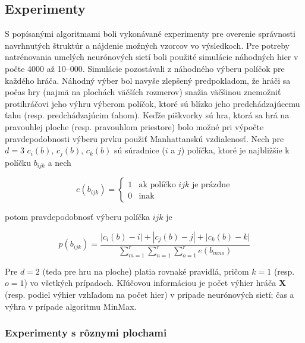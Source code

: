 \subsection{Experimenty}\label{subsec:experiments}
S popísanými algoritmami boli vykonávané experimenty pre overenie správnosti navrhnutých štruktúr a nájdenie možných
vzorcov vo výsledkoch.
Pre potreby natrénovania umelých neurónových sietí boli použité simulácie náhodných hier v počte 4000 až 10--000.
Simulácie pozostávali z náhodného výberu políčok pre každého hráča.
Náhodný výber bol navyše zlepšený predpokladom, že hráči sa počas hry (najmä na plochách väčších rozmerov) snažia
väčšinou znemožniť protihráčovi jeho výhru výberom políčok, ktoré sú blízko jeho predchádzajúcemu ťahu
(resp. predchádzajúcim ťahom).
Keďže piškvorky sú hra, ktorá sa hrá na pravouhlej ploche (resp. pravouhlom priestore) bolo možné pri výpočte
pravdepodobnosti výberu prvku použiť Manhattanskú vzdialenosť.
Nech pre $d=3$ $c_i(b)$, $c_j(b)$, $c_k(b)$ sú súradnice ($i$ a $j$) políčka, ktoré je najbližšie k políčku $b_{ijk}$ a
nech

\begin{equation}
    e(b_{ijk}) =
    \begin{cases}
        1 & \text{ak políčko }ijk\text{ je prázdne} \\
        0 & \text{inak}
    \end{cases}
\end{equation}

potom pravdepodobnosť výberu políčka $ijk$ je

\begin{equation}
    p(b_{ijk}) = \frac{|c_i(b) - i| + |c_j(b) - j| + |c_k(b) - k|}{\sum_{m=1}^r\sum_{n=1}^r\sum_{o=1}^r e(b_{mno})}
\end{equation}

Pre $d=2$ (teda pre hru na ploche) platia rovnaké pravidlá, pričom $k=1$ (resp. $o=1$) vo všetkých prípadoch.
Kľúčovou informáciou je počet výhier hráča \textbf{X} (resp. podiel výhier vzhľadom na počet hier) v prípade
neurónových sietí; čas a výhra v prípade algoritmu MinMax.

\subsubsection{Experimenty s rôznymi plochami}\label{subsec:experiments-board}

